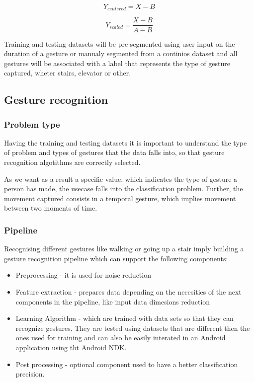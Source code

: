 \begin{equation}
Y_{centered} = X - B
\label{eq:center}
\end{equation}

\begin{equation}
Y_{scaled} = \frac{X - B}{A-B}
\label{eq:normalisation}
\end{equation}

Training and testing datasets will be pre-segmented using user input on the duration of a gesture or manualy segmented from a continios dataset and all gestures will be associated with a label that represents the type of gesture captured, wheter stairs, elevator or other.

\subsection{Gesture recognition}

\subsubsection{Problem type}
Having the training and testing datasets it is important to understand the type of problem and types of gestures that the data falls into, so that gesture recognition algotithms are correctly selected. 

As we want as a result a specific value, which indicates the type of gesture a person has made, the usecase falls into the classification problem.
Further, the movement captured consists in a temporal gesture, which implies movement between two moments of time.

\subsubsection{Pipeline}

Recognising different gestures like walking or going up a stair imply building a gesture recognition pipeline which can support the following components:
\begin{itemize}
\item Preprocessing - it is used for noise reduction
\item Feature extraction - prepares data depending on the necesities of the next components in the pipeline, like input data dimesions reduction
\item Learning Algorithm - which are trained with data sets so that they can recognize gestures. They are tested using datasets that are different then the ones used for training and can also be easily interated in an Android application using tht Android NDK.
\item Post processing - optional component used to have a better classification precision.
\end{itemize}

